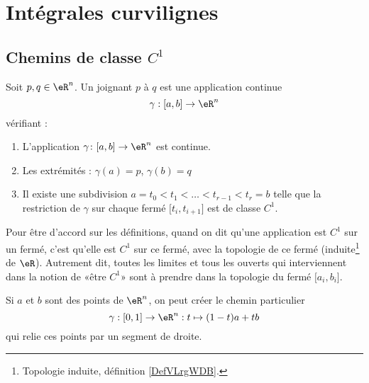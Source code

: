 \section{Intégrales curvilignes}
\label{secintcurvi}

\subsection{Chemins de classe \texorpdfstring{\( C^1\)}{C1}}

\begin{definition}      \label{DEFooQTAWooOCmSJo}
	Soit \( p, q\in \eR^n\). Un  joignant \( p\) à \( q\) est une application continue
	\begin{equation}
		\gamma : [a,b] \to \eR^n
	\end{equation}
	vérifiant :
	\begin{enumerate}
		\item
		      L'application \(\gamma \colon \mathopen[ a,b\mathclose]\to \eR^n  \) est continue.
		\item
		      Les extrémités : $\gamma(a) = p$, $\gamma(b) = q$
		\item
		      Il existe une subdivision \( a = t_0 < t_1 < \ldots < t_{r-1} < t_r = b\) telle que la restriction de \( \gamma\) sur chaque fermé \( \mathopen[t_i, t_{i+1}\mathclose]\) est de classe \( C^1\).
	\end{enumerate}
	Pour être d'accord sur les définitions, quand on dit qu'une application est \( C^1\) sur un fermé, c'est qu'elle est \( C^1\) sur ce fermé, avec la topologie de ce fermé (induite\footnote{Topologie induite, définition \ref{DefVLrgWDB}.} de \( \eR\)). Autrement dit, toutes les limites et tous les ouverts qui interviennent dans la notion de «être \( C^1\)» sont à prendre dans la topologie du fermé \( \mathopen[ a_i,b_i\mathclose]\).
\end{definition}

\begin{remark}
	Si \( a\) et \( b\) sont des points de \( \eR^n\), on peut créer le chemin particulier
	\begin{equation}
		\gamma : [0,1] \to \eR^n : t \mapsto (1-t)a + tb
	\end{equation}
	qui relie ces points par un segment de droite.
\end{remark}

